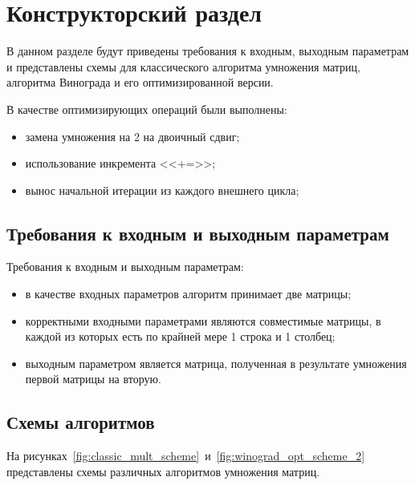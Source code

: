 \chapter{Конструкторский раздел}

В данном разделе будут приведены требования к входным, выходным параметрам и представлены схемы для классического алгоритма умножения матриц, алгоритма Винограда и его оптимизированной версии.

В качестве оптимизирующих операций были выполнены:

\begin{itemize}[label=--]
    \item замена умножения на 2 на двоичный сдвиг;
    \item использование инкремента <<+=>>;
    \item вынос начальной итерации из каждого внешнего цикла;
\end{itemize}

\section{Требования к входным и выходным параметрам}

Требования к входным и выходным параметрам:
\begin{itemize}[label=--]
    \item в качестве входных параметров алгоритм принимает две матрицы;
    \item корректными входными параметрами являются совместимые матрицы, в каждой из которых есть по крайней мере 1 строка и 1 столбец;
    \item выходным параметром является матрица, полученная в результате умножения первой матрицы на вторую.
\end{itemize}

\section{Схемы алгоритмов}

На рисунках~\ref{fig:classic_mult_scheme}~и~\ref{fig:winograd_opt_scheme_2} представлены схемы различных алгоритмов умножения матриц.

